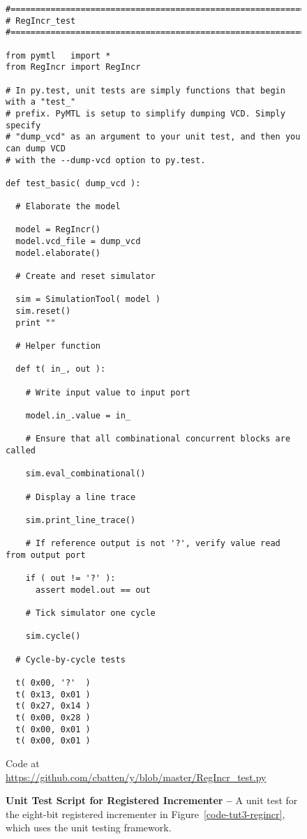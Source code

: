 
\begin{figure}

  \begin{lstlisting}[xleftmargin={0.9in}]
#=========================================================================
# RegIncr_test
#=========================================================================

from pymtl   import *
from RegIncr import RegIncr

# In py.test, unit tests are simply functions that begin with a "test_"
# prefix. PyMTL is setup to simplify dumping VCD. Simply specify
# "dump_vcd" as an argument to your unit test, and then you can dump VCD
# with the --dump-vcd option to py.test.

def test_basic( dump_vcd ):

  # Elaborate the model

  model = RegIncr()
  model.vcd_file = dump_vcd
  model.elaborate()

  # Create and reset simulator

  sim = SimulationTool( model )
  sim.reset()
  print ""

  # Helper function

  def t( in_, out ):

    # Write input value to input port

    model.in_.value = in_

    # Ensure that all combinational concurrent blocks are called

    sim.eval_combinational()

    # Display a line trace

    sim.print_line_trace()

    # If reference output is not '?', verify value read from output port

    if ( out != '?' ):
      assert model.out == out

    # Tick simulator one cycle

    sim.cycle()

  # Cycle-by-cycle tests

  t( 0x00, '?'  )
  t( 0x13, 0x01 )
  t( 0x27, 0x14 )
  t( 0x00, 0x28 )
  t( 0x00, 0x01 )
  t( 0x00, 0x01 )
\end{lstlisting}

  \centerline{\small Code at
    \url{https://github.com/cbatten/y/blob/master/RegIncr_test.py}}

  \caption{\textbf{Unit Test Script for Registered Incrementer --} A unit
    test for the eight-bit registered incrementer in
    Figure~\ref{code-tut3-regincr}, which uses the  unit
    testing framework.}
  \label{code-tut3-regincr-test}

\end{figure}

